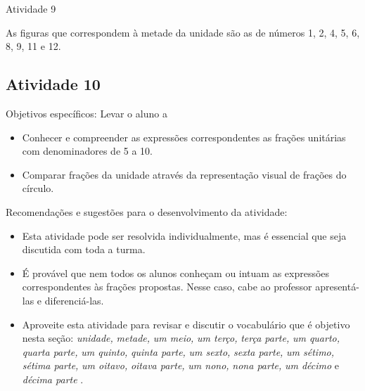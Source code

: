 \documentclass[oneside]{book}
\begin{document}
\begin{multicols}{2}
\begin{resposta*}{Atividade 9}

  As figuras que correspondem à metade da unidade são as de números 1, 2, 4, 5, 6, 8, 9, 11 e 12.
\end{resposta*}




\subsection{Atividade 10}
  Objetivos específicos: Levar o aluno a
\begin{itemize} %
    \item       Conhecer e compreender as expressões correspondentes as frações unitárias com denominadores de 5 a 10.
    \item       Comparar frações da unidade através da representação visual de frações do círculo.
\end{itemize} %


  Recomendações e sugestões para o desenvolvimento da atividade:
\begin{itemize} %
    \item       Esta atividade pode ser resolvida individualmente, mas é essencial que seja discutida com toda a turma.
    \item       É provável que nem todos os alunos conheçam ou intuam as expressões correspondentes às frações propostas. Nesse caso, cabe ao professor apresentá-las e diferenciá-las.
    \item       Aproveite esta atividade para revisar e discutir o vocabulário que é objetivo nesta seção:       {\it unidade,}             {\it metade,}             {\it um meio,}             {\it um terço,}             {\it terça parte,}             {\it um quarto,}             {\it quarta parte,}             {\it um quinto,}             {\it quinta parte,}             {\it um sexto,}             {\it sexta parte,}             {\it um sétimo,}             {\it sétima parte,}             {\it um oitavo,}             {\it oitava parte,}             {\it um nono,}             {\it nona parte,}             {\it um décimo}       e       {\it décima parte}      .
\end{itemize} %





\end{multicols}
\end{document}
